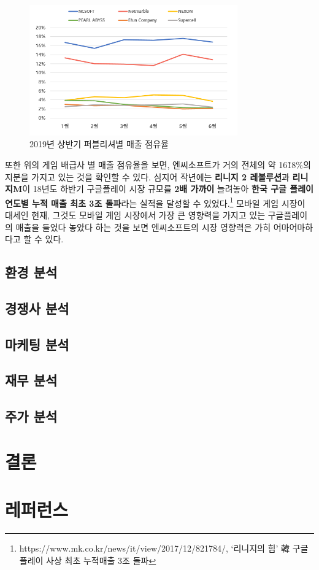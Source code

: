 \documentclass[11pt]{oblivoir}
\begin{document}
		 \begin{figure}[htbp]
		 	\centering
		 	\includegraphics[width=0.8\textwidth]{PublisherMaechul.png}
		 	\caption{2019년 상반기 퍼블리셔별 매출 점유율}
		 \end{figure}
	 
	 	또한 위의 게임 배급사 별 매출 점유율을 보면, 엔씨소프트가 거의 전체의 약 16\~18\%의 지분을 가지고 있는 것을 확인할 수 있다. 심지어 작년에는 \textbf{리니지 2 레볼루션}과 
	 	\textbf{리니지M}이 18년도 하반기 구글플레이 시장 규모를 \textbf{2배 가까이} 늘려놓아 \textbf{한국 구글 플레이 연도별 누적 매출 최초 3조 돌파}라는 실적을 달성할 수 있었다.\footnote{https://www.mk.co.kr/news/it/view/2017/12/821784/, ‘리니지의 힘’ 韓 구글 플레이 사상 최초 누적매출 3조 돌파} 모바일 게임 시장이 대세인 현재, 그것도 모바일 게임 시장에서 가장 큰 영향력을 가지고 있는 구글플레이의 매출을 들었다 놓았다 하는 것을 보면 엔씨소프트의 시장 영향력은 가히 어마어마하다고 할 수 있다. 
	 	
		
		\subsection{환경 분석}
		
		\subsection{경쟁사 분석}
		
		\subsection{마케팅 분석}
		
		\subsection{재무 분석}
		
		\subsection{주가 분석}
	
	\section{결론}
	
	\section{레퍼런스}
	
\end{document}
